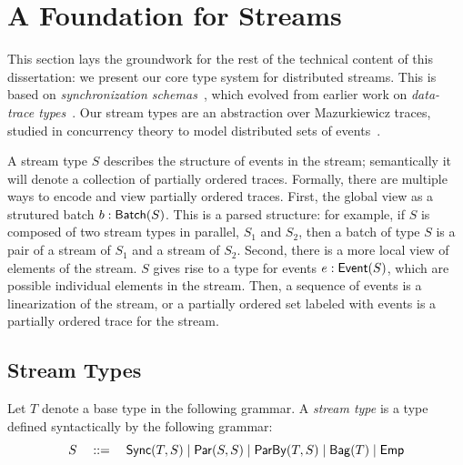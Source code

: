 \chapter{A Foundation for Streams}
\label{cha:foundation}

This section lays the groundwork for the rest of the technical content of this dissertation: we present our core type system for distributed streams. This is based on \emph{synchronization schemas}~, which evolved from earlier work on \emph{data-trace types}~.
Our stream types are an abstraction over Mazurkiewicz traces, studied in concurrency theory to model distributed sets of events~\cite{mazurkiewicz1986trace,DiekertR1995}.

A stream type $S$ describes the structure of events in the stream;
semantically it will denote a collection of partially ordered traces.
Formally, there are multiple ways to encode and view partially ordered traces.
First, the global view as a strutured batch $b: \mathsf{Batch}({S})$.
This is a parsed structure: for example, if $S$ is composed of two stream types in parallel, $S_1$ and $S_2$, then a batch of type $S$ is a pair of a stream of $S_1$ and a stream of $S_2$.
Second, there is a more local view of elements of the stream.
$S$ gives rise to a type for events $e: \mathsf{Event}({S})$,
which are possible individual elements in the stream.
Then, a sequence of events is a linearization of the stream,
or a partially ordered set labeled with events is a partially ordered trace
for the stream.

\section{Stream Types}

\begin{definition}
Let $T$ denote a base type in the following grammar.
A \emph{stream type} is a type defined syntactically by the following grammar:
\[
  S \quad ::= \quad
    \mathsf{Sync}({T}, S) \mid
    \mathsf{Par}({S}, {S}) \mid
    \mathsf{ParBy}({T}, S) \mid
    \mathsf{Bag}({T}) \mid
    \mathsf{Emp}{}
\]
\end{definition}

